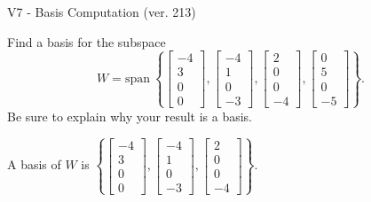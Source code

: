 \begin{exercise}
  \begin{exerciseTitle}V7 - Basis Computation (ver. 213)\end{exerciseTitle}
  \begin{exerciseStatement}
    Find a basis for the subspace 
\[W=\mathrm{span}\ \left\{\left[\begin{array}{r}
-4 \\
3 \\
0 \\
0
\end{array}\right] , \left[\begin{array}{r}
-4 \\
1 \\
0 \\
-3
\end{array}\right] , \left[\begin{array}{r}
2 \\
0 \\
0 \\
-4
\end{array}\right] , \left[\begin{array}{r}
0 \\
5 \\
0 \\
-5
\end{array}\right]\right\}.\]
 Be sure to explain why your result is a basis.


  \end{exerciseStatement}
  \begin{exerciseAnswer}
   A basis of \(W\) is  \(\left\{\left[\begin{array}{r}
-4 \\
3 \\
0 \\
0
\end{array}\right] , \left[\begin{array}{r}
-4 \\
1 \\
0 \\
-3
\end{array}\right] , \left[\begin{array}{r}
2 \\
0 \\
0 \\
-4
\end{array}\right]\right\}\).
  


  \end{exerciseAnswer}
\end{exercise}